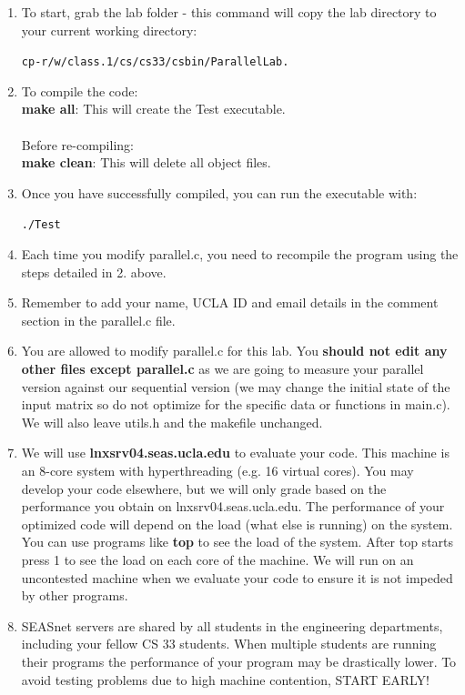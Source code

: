 \documentclass[11pt]{article}
\newenvironment{tty}%
{\small\begin{alltt}}%
{\end{alltt}}
\begin{document}
\begin{enumerate}
    \item To start, grab the lab folder - this command will copy the lab directory to your current working directory:
        \begin{tty}
        cp -r /w/class.1/cs/cs33/csbin/ParallelLab .
        \end{tty}
    \item To compile the code:\\
            \textbf{make all}: This will create the Test executable.\\
            \\
          Before re-compiling:\\
            \textbf{make clean}: This will delete all object files.\\
    \item Once you have successfully compiled, you can run the executable with:
        \begin{tty}
            ./Test
        \end{tty}
    \item Each time you modify parallel.c, you need to recompile the program using the steps detailed in 2. above. 
    \item Remember to add your name, UCLA ID and email details in the comment section in the parallel.c file.
    \item You are allowed to modify parallel.c for this lab. You \textbf{should not edit any other files except parallel.c} as we are going to measure your parallel version against our sequential version (we may change the initial state of the input matrix so do not optimize for the specific data or functions in main.c). We will also leave utils.h and the makefile unchanged.
    \item We will use \textbf{lnxsrv04.seas.ucla.edu} to evaluate your code. This machine is an 8-core system with hyperthreading (e.g. 16 virtual cores). You may develop your code elsewhere, but we will only grade based on the performance you obtain on lnxsrv04.seas.ucla.edu. The performance of your optimized code will depend on the load (what else is running) on the system. You can use programs like \textbf{top} to see the load of the system. After top starts press 1 to see the load on each core of the machine. We will run on an uncontested machine when we evaluate your code to ensure it is not impeded by other programs.
    \item SEASnet servers are shared by all students in the engineering departments, including your fellow CS 33 students. When multiple students are running their programs the performance of your program may be drastically lower. To avoid testing problems due to high machine contention, START EARLY!



\end{enumerate}
\end{document}
